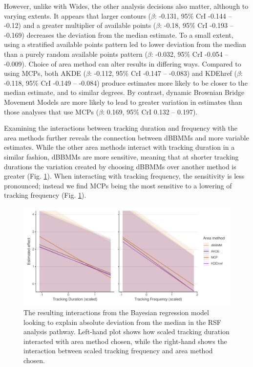 \documentclass[10pt,a4paper]{article}
\begin{document}
However, unlike with Wides, the other analysis decisions also matter, although to varying extents.
It appears that larger contours (\(\beta\): -0.131, 95\% CrI -0.144 -- -0.12) and a greater multiplier of available points (\(\beta\): -0.18, 95\% CrI -0.193 -- -0.169) decreases the deviation from the median estimate.
To a small extent, using a stratified available points pattern led to lower deviation from the median than a purely random available points pattern (\(\beta\): -0.032, 95\% CrI -0.054 -- -0.009).
Choice of area method can alter results in differing ways.
Compared to using MCPs, both AKDE (\(\beta\): -0.112, 95\% CrI -0.147 -- -0.083) and KDEhref (\(\beta\): -0.118, 95\% CrI -0.149 -- -0.084) produce estimates more likely to be closer to the median estimate, and to similar degrees.
By contrast, dynamic Brownian Bridge Movement Models are more likely to lead to greater variation in estimates than those analyses that use MCPs (\(\beta\): 0.169, 95\% CrI 0.132 -- 0.197).

Examining the interactions between tracking duration and frequency with the area methods further reveals the connection between dBBMMs and more variable estimates.
While the other area methods interact with tracking duration in a similar fashion, dBBMMs are more sensitive, meaning that at shorter tracking durations the variation created by choosing dBBMMs over another method is greater (Fig. \ref{fig:rsfInteractions}).
When interacting with tracking frequency, the sensitivity is less pronounced; instead we find MCPs being the most sensitive to a lowering of tracking frequency (Fig. \ref{fig:rsfInteractions}).

\begin{figure}
\includegraphics[width=1\linewidth]{../figures/rsfEffectPlot_iteractions} \caption{The resulting interactions from the Bayesian regression model looking to explain absolute deviation from the median in the RSF analysis pathway. Left-hand plot shows how scaled tracking duration interacted with area method chosen, while the right-hand shows the interaction between scaled tracking frequency and area method chosen.}\label{fig:rsfInteractions}
\end{figure}
\end{document}
